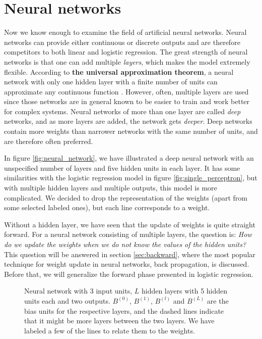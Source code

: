 \section{Neural networks} \label{sec:neural_network}
Now we know enough to examine the field of artificial neural networks. Neural networks can provide either continuous or discrete outputs and are therefore competitors to both linear and logistic regression. The great strength of neural networks is that one can add multiple \textit{layers}, which makes the model extremely flexible. According to \textbf{the universal approximation theorem}, a neural network with only one hidden layer with a finite number of units can approximate any continuous function \supercite{hornik_multilayer_1989}. However, often, multiple layers are used since those networks are in general known to be easier to train and work better for complex systems. Neural networks of more than one layer are called \textit{deep} networks, and as more layers are added, the network gets \textit{deeper}. Deep networks contain more weights than narrower networks with the same number of units, and are therefore often preferred.

In figure \eqref{fig:neural_network}, we have illustrated a deep neural network with an unspecified number of layers and five hidden units in each layer. It has some similarities with the logistic regression model in figure \eqref{fig:single_perceptron}, but with multiple hidden layers and multiple outputs, this model is more complicated. We decided to drop the representation of the weights (apart from some selected labeled ones), but each line corresponds to a weight.

Without a hidden layer, we have seen that the update of weights is quite straight forward. For a neural network consisting of multiple layers, the question is: \textit{How do we update the weights when we do not know the values of the hidden units?} This question will be answered in section \ref{sec:backward}, where the most popular technique for weight update in neural networks, back propagation, is discussed. Before that, we will generalize the forward phase presented in logistic regression.

\begin{figure}
	\centering
	
	\caption{Neural network with 3 input units, $L$ hidden layers with 5 hidden units each and two outputs. $B^{(0)}$, $B^{(1)}$, $B^{(l)}$ and $B^{(L)}$ are the bias units for the respective layers, and the dashed lines indicate that it might be more layers between the two layers. We have labeled a few of the lines to relate them to the weights.}
	\label{fig:neural_network}
\end{figure}

